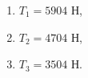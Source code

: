 \begin{enumerate}
\item $T_1 = 5904$ Н,
\item $T_2 = 4704$ Н,
\item $T_3 = 3504$ Н.
\end{enumerate}
